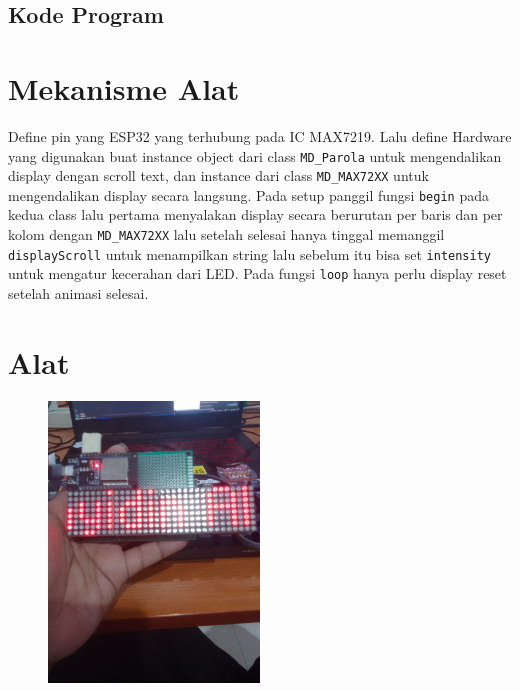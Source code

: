 \documentclass[a4paper,12pt]{article} %
\begin{document}
\subsection{Kode Program}

\section{Mekanisme Alat}
Define pin yang ESP32 yang terhubung pada IC MAX7219. Lalu define Hardware yang digunakan
buat instance object dari class \texttt{MD\_Parola} untuk mengendalikan display dengan scroll text, 
dan instance dari class \texttt{MD\_MAX72XX} untuk mengendalikan display secara langsung. Pada setup panggil
fungsi \texttt{begin} pada kedua class lalu pertama menyalakan display secara berurutan per baris dan per kolom
dengan \texttt{MD\_MAX72XX} lalu setelah selesai hanya tinggal memanggil \texttt{displayScroll} untuk menampilkan string
lalu sebelum itu bisa set \texttt{intensity} untuk mengatur kecerahan dari LED.
Pada fungsi \texttt{loop} hanya perlu display reset setelah animasi selesai.

\section{Alat}
\begin{figure}[h]
    \centering
    \includegraphics[width=0.5\textwidth]{alat.jpeg} 
    \label{fig:alat}
\end{figure}
\end{document}
